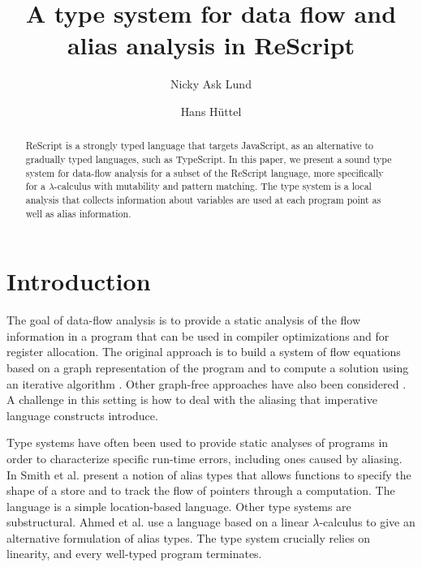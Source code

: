 \documentclass{eptcs}
\begin{document}
\title{A type system for data flow and alias analysis in ReScript}

\author{Nicky Ask Lund  \and Hans Hüttel } 

\def\titlerunning{A type system for data flow and alias analysis in ReScript}
\def\authorrunning{Lund and Hüttel}

\maketitle


\begin{abstract}
	ReScript is a strongly typed language that targets
        JavaScript, as an alternative to gradually typed languages,
        such as TypeScript. In this paper, we present a sound type system
        for data-flow analysis for a subset of the ReScript language,
        more specifically for a $\lambda$-calculus with mutability and
        pattern matching. The type system is a local analysis that
        collects information about variables are used at each program
        point as well as alias information. 
\end{abstract}



\section{Introduction}

The goal of data-flow analysis is to provide a static analysis of the
flow information in a program that can be used in compiler
optimizations and for register allocation. The original approach is to
build a system of flow equations based on a graph representation of
the program and to compute a solution using an iterative algorithm
\cite{KildallGaryA1973Auat,RyderBarbara1988Idaa}. Other graph-free
approaches have also been considered
\cite{HorspoolR.Niegel2002AGAt}. A challenge in this setting is how to
deal with the aliasing that imperative language constructs introduce.

Type systems have often been used to provide static analyses of
programs in order to characterize specific run-time errors, including
ones caused by aliasing. In \cite{10.1007/3-540-46425-5_24} Smith et
al. present a notion of alias types that allows functions to specify
the shape of a store and to track the flow of pointers through a
computation. The language is a simple location-based language. Other
type systems are substructural. Ahmed et
al. \cite{DBLP:conf/tlca/MorrisettAF05} use a language based on a
linear $\lambda$-calculus to give an alternative formulation of alias
types. The type system crucially relies on linearity, and every
well-typed program terminates.
\end{document}
